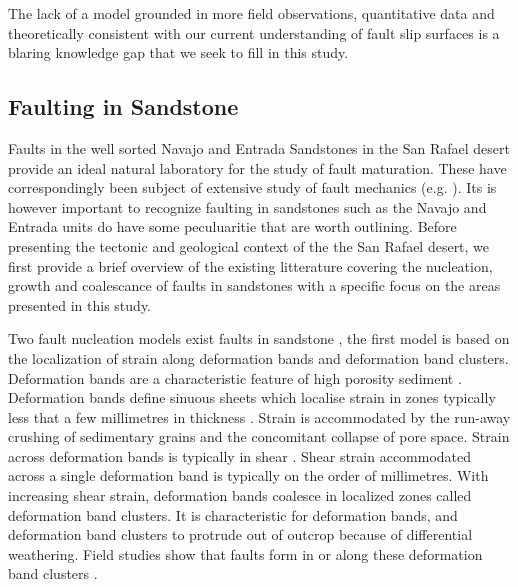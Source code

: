 \documentclass[12pt,a4paper]{article}
\begin{document}
The lack of a model grounded in more field observations, quantitative data and theoretically consistent with our current understanding of fault slip surfaces is a blaring knowledge gap that we seek to fill in this study. 




\subsection{Faulting in Sandstone}

Faults in the well sorted Navajo and Entrada Sandstones in the San Rafael desert provide an ideal natural laboratory for the study of fault maturation. These have correspondingly been subject of extensive study of fault mechanics (e.g. \cite{aydin1977faulting, aydin1978development, krantz1986orthorhombic, shipton2001damage, shipton2002structural, shipton2003conceptual, fossen1998deformation, fossen2005fault}  \cite{fossen2007deformation}). Its is however important to recognize faulting in sandstones such as the Navajo and Entrada units do have some peculuaritie that are worth outlining. Before presenting the tectonic and geological context of the the San Rafael desert, we first provide a brief overview of the existing litterature covering the nucleation, growth and coalescance of faults in sandstones with a specific focus on the areas presented in this study.

Two fault nucleation models exist faults in sandstone \cite{aydin1977faulting, davatzes2003overprinting}, the first model is based on the localization of strain along deformation bands and deformation band clusters. Deformation bands are a characteristic feature of high porosity sediment \cite{aydin1977faulting, aydin1978development, fossen2007deformation}. Deformation bands define sinuous sheets which localise strain in zones typically less that a few millimetres in thickness \cite{fossen2007deformation}. Strain is accommodated by the run-away crushing of sedimentary grains and the concomitant collapse of pore space. Strain across deformation bands is typically in shear \cite{fossen2007deformation}. Shear strain accommodated across a single deformation band is typically on the order of millimetres. With increasing shear strain, deformation bands coalesce in localized zones called  deformation band clusters. It is characteristic for deformation bands, and deformation band clusters to protrude out of outcrop because of differential weathering. Field studies show that faults form in or along these deformation band clusters \cite{aydin1977faulting}. 
\end{document}
